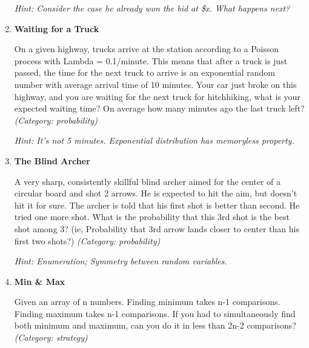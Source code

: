 \begin{enumerate}
\small\emph{Hint: Consider the case he already won the bid at \$x. What happens next?}





\item \textbf{Waiting for a Truck}

On a given highway, trucks arrive at the station according to a Poisson process with Lambda = 0.1/minute. This means that after a truck is just passed, the time for the next truck to arrive is an exponential random number with average arrival time of 10 minutes. Your car just broke on this highway, and you are waiting for the next truck for hitchhiking, what is your expected waiting time? On average how many minutes ago the last truck left?
\small\emph{(Category: probability)}

\small\emph{Hint: It's not 5 minutes. Exponential distribution has memoryless property.}





\item \textbf{The Blind Archer}

A very sharp, consistently skillful blind archer aimed for the center of a circular board and shot 2 arrows. He is expected to hit the aim, but doesn't hit it for sure. The archer is told that his first shot is better than second. He tried one more shot. What is the probability that this 3rd shot is the best shot among 3?
(ie, Probability that 3rd arrow lands closer to center than his first two shots?)
\small\emph{(Category: probability)}

\small\emph{Hint: Enumeration; Symmetry between random variables.}





\item \textbf{Min \& Max}

Given an array of n numbers. Finding minimum takes n-1 comparisons. Finding maximum takes n-1 comparisons. If you had to simultaneously find both minimum and maximum, can you do it in less than 2n-2 comparisons?
\small\emph{(Category: strategy)}


\end{enumerate}
